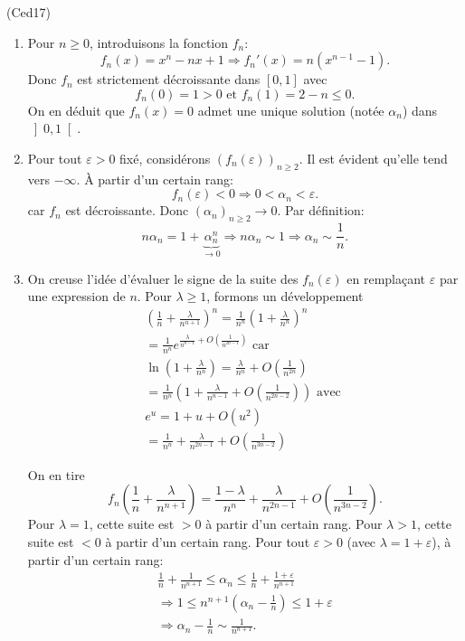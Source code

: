 \begin{tiny}(Ced17)\end{tiny} 
\begin{enumerate}
  \item Pour $n\geq 0$, introduisons la fonction $f_n$:
\[
  f_n(x) = x^n -nx +1 \Rightarrow f_n'(x) = n(x^{n-1} - 1) .
\]
Donc $f_n$ est strictement décroissante dans $\left[0,1\right]$ avec 
\[
  f_n(0) = 1 >0 \text{ et } f_n(1) = 2 - n \leq 0.
\]
On en déduit que $f_n(x)= 0$ admet une unique solution (notée $\alpha_n$) dans $\left] 0,1 \right[$.

  \item Pour tout $\varepsilon >0$ fixé, considérons $(f_n(\varepsilon))_{n \geq 2}$. Il est évident qu'elle tend vers $-\infty$.\newline
\`A partir d'un certain rang:
\[
  f_n(\varepsilon) < 0 \Rightarrow 0 < \alpha_n < \varepsilon .
\]
car $f_n$ est décroissante. Donc $(\alpha _{n})_{n\geq 2} \rightarrow 0$.\newline
Par définition:
\[
  n\alpha_n = 1 + \underset{\rightarrow 0}{\underbrace{\alpha_n^n}} \Rightarrow n\alpha_n \sim 1 \Rightarrow \alpha_n\sim \frac{1}{n}.
\]

  \item On creuse l'idée d'évaluer le signe de la suite des $f_n(\varepsilon)$ en remplaçant $\varepsilon$ par une expression de $n$.\newline
Pour $\lambda \geq 1$, formons un développement 
\begin{multline*}
  \left(\frac{1}{n} + \frac{\lambda}{n^{n+1}}\right)^n
  = \frac{1}{n^n}\left( 1 + \frac{\lambda}{n^n}\right)^n\\
  = \frac{1}{n^n} e^{\frac{\lambda}{n^{n-1}} + O(\frac{1}{n^{2n-1}})} \text{ car} \\
          \ln(1+\frac{\lambda}{n^n}) = \frac{\lambda}{n^n} + O(\frac{1}{n^{2n}}) \\
  = \frac{1}{n^n}\left( 1 + \frac{\lambda}{n^{n-1}} + O(\frac{1}{n^{2n-2}})\right) \text{ avec }  \\
  e^u = 1 + u + O(u^2)\\
  = \frac{1}{n^n} + \frac{\lambda}{n^{2n-1}} + O(\frac{1}{n^{3n-2}})
\end{multline*}

On en tire
\[
  f_n\left( \frac{1}{n} + \frac{\lambda}{n^{n+1}}\right)
  = \frac{1-\lambda}{n^n} + \frac{\lambda}{n^{2n-1}} + O(\frac{1}{n^{3n-2}}). 
\]
Pour $\lambda = 1$, cette suite est $>0$ à partir d'un certain rang. Pour $\lambda >1$, cette suite est $<0$ à partir d'un certain rang.\newline
Pour tout $\varepsilon >0$ (avec $\lambda = 1 +\varepsilon$), à partir d'un certain rang:
\begin{multline*}
  \frac{1}{n} + \frac{1}{n^{n+1}} \leq \alpha_n \leq \frac{1}{n} + \frac{1+\varepsilon}{n^{n+1}} \\
  \Rightarrow
  1 \leq n^{n+1} \left( \alpha_n - \frac{1}{n}\right) \leq 1 + \varepsilon \\
  \Rightarrow \alpha_n - \frac{1}{n} \sim \frac{1}{n^{n+1}}.
\end{multline*}


\end{enumerate}
